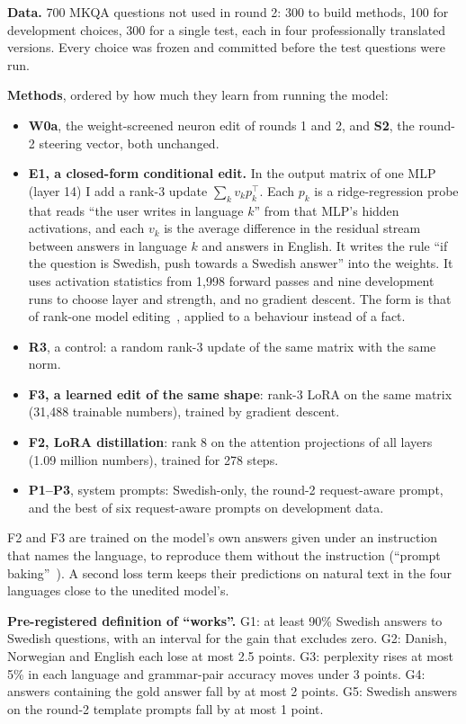 \documentclass[10pt,a4paper]{article}
\begin{document}
\textbf{Data.} 700 MKQA questions not used in round 2: 300 to build methods, 100 for development choices, 300 for a single test, each in four professionally translated versions. Every choice was frozen and committed before the test questions were run.

\textbf{Methods}, ordered by how much they learn from running the model:
\begin{itemize}
\item \textbf{W0a}, the weight-screened neuron edit of rounds 1 and 2, and \textbf{S2}, the round-2 steering vector, both unchanged.
\item \textbf{E1, a closed-form conditional edit.} In the output matrix of one MLP (layer 14) I add a rank-3 update $\sum_k v_k p_k^{\top}$. Each $p_k$ is a ridge-regression probe that reads ``the user writes in language $k$'' from that MLP's hidden activations, and each $v_k$ is the average difference in the residual stream between answers in language $k$ and answers in English. It writes the rule ``if the question is Swedish, push towards a Swedish answer'' into the weights. It uses activation statistics from 1,998 forward passes and nine development runs to choose layer and strength, and no gradient descent. The form is that of rank-one model editing~\cite{meng2022rome}, applied to a behaviour instead of a fact.
\item \textbf{R3}, a control: a random rank-3 update of the same matrix with the same norm.
\item \textbf{F3, a learned edit of the same shape}: rank-3 LoRA on the same matrix (31,488 trainable numbers), trained by gradient descent.
\item \textbf{F2, LoRA distillation}: rank 8 on the attention projections of all layers (1.09 million numbers), trained for 278 steps.
\item \textbf{P1--P3}, system prompts: Swedish-only, the round-2 request-aware prompt, and the best of six request-aware prompts on development data.
\end{itemize}
F2 and F3 are trained on the model's own answers given under an instruction that names the language, to reproduce them without the instruction (``prompt baking''~\cite{bhargava2024}). A second loss term keeps their predictions on natural text in the four languages close to the unedited model's.

\textbf{Pre-registered definition of ``works''.} G1: at least 90\% Swedish answers to Swedish questions, with an interval for the gain that excludes zero. G2: Danish, Norwegian and English each lose at most 2.5 points. G3: perplexity rises at most 5\% in each language and grammar-pair accuracy moves under 3 points. G4: answers containing the gold answer fall by at most 2 points. G5: Swedish answers on the round-2 template prompts fall by at most 1 point.
\end{document}
